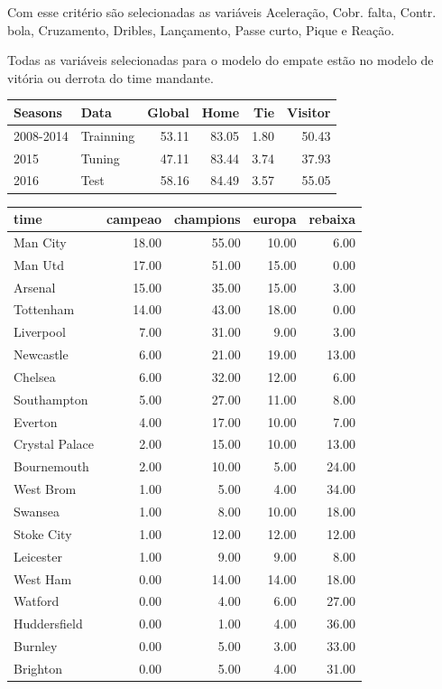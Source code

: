 \documentclass[review]{elsarticle}
\begin{document}
 
Com esse critério são selecionadas as variáveis Aceleração, Cobr. falta, Contr. bola, Cruzamento, Dribles, Lançamento, Passe curto, Pique e  Reação. 

Todas as variáveis selecionadas para o modelo do empate estão no modelo de vitória ou derrota do time mandante.


\begin{table}[ht]
\centering
\begin{tabular}{llrrrr}
  \hline
Seasons & Data & Global & Home & Tie & Visitor \\ 
  \hline
2008-2014 & Trainning & 53.11 & 83.05 & 1.80 & 50.43 \\ 
  2015 & Tuning & 47.11 & 83.44 & 3.74 & 37.93 \\ 
  2016 & Test & 58.16 & 84.49 & 3.57 & 55.05 \\ 
   \hline
\end{tabular}
\end{table}



\begin{table}[ht]
\centering
\begin{tabular}{lrrrr}
  \hline
time & campeao & champions & europa & rebaixa \\ 
  \hline
Man City & 18.00 & 55.00 & 10.00 & 6.00 \\ 
  Man Utd & 17.00 & 51.00 & 15.00 & 0.00 \\ 
  Arsenal & 15.00 & 35.00 & 15.00 & 3.00 \\ 
  Tottenham & 14.00 & 43.00 & 18.00 & 0.00 \\ 
  Liverpool & 7.00 & 31.00 & 9.00 & 3.00 \\ 
  Newcastle & 6.00 & 21.00 & 19.00 & 13.00 \\ 
  Chelsea & 6.00 & 32.00 & 12.00 & 6.00 \\ 
  Southampton & 5.00 & 27.00 & 11.00 & 8.00 \\ 
  Everton & 4.00 & 17.00 & 10.00 & 7.00 \\ 
  Crystal Palace & 2.00 & 15.00 & 10.00 & 13.00 \\ 
  Bournemouth & 2.00 & 10.00 & 5.00 & 24.00 \\ 
  West Brom & 1.00 & 5.00 & 4.00 & 34.00 \\ 
  Swansea & 1.00 & 8.00 & 10.00 & 18.00 \\ 
  Stoke City & 1.00 & 12.00 & 12.00 & 12.00 \\ 
  Leicester & 1.00 & 9.00 & 9.00 & 8.00 \\ 
  West Ham & 0.00 & 14.00 & 14.00 & 18.00 \\ 
  Watford & 0.00 & 4.00 & 6.00 & 27.00 \\ 
  Huddersfield & 0.00 & 1.00 & 4.00 & 36.00 \\ 
  Burnley & 0.00 & 5.00 & 3.00 & 33.00 \\ 
  Brighton & 0.00 & 5.00 & 4.00 & 31.00 \\ 
   \hline
\end{tabular}
\end{table}
\end{document}
